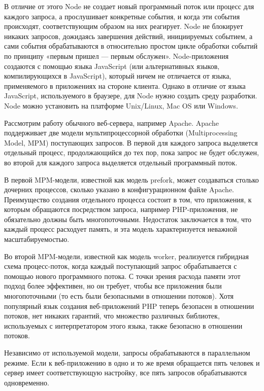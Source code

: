 В отличие от этого Node не создает новый программный поток или процесс для каждого запроса, а прослушивает конкретные события, и когда эти события происходят, соответствующим образом на них реагирует. Node не блокирует никаких запросов, дожидаясь завершения действий, инициируемых событием, а сами события обрабатываются в относительно простом цикле обработки событий по принципу «первым пришел — первым обслужен».
Node-приложения создаются с помощью языка JavaScript (или альтернативных языков, компилирующихся в JavaScript), который ничем не отличается от языка, применяемого в приложениях на стороне клиента. Однако в отличие от языка JavaScript, используемого в браузере, для Node нужно создать среду разработки. Node можно установить на платформе Unix/Linux, Mac OS или Windows.

Рассмотрим работу обычного веб-сервера, например Apache. Apache поддерживает две модели мультипроцессорной обработки (Multiprocessing Model, MPM) поступающих запросов. В первой для каждого запроса выделяется отдельный процесс, продолжающийся до тех пор, пока запрос не будет обслужен, во второй для каждого запроса выделяется отдельный программный поток.

В первой MPM-модели, известной как модель prefork, может создаваться столько дочерних процессов, сколько указано в конфигурационном файле Apache. Преимущество создания отдельного процесса состоит в том, что приложения, к которым обращаются посредством запроса, например PHP-приложения, не обязательно должны быть многопоточными. Недостаток заключается в том, что каждый процесс расходует память, и эта модель характеризуется неважной масштабируемостью.

Во второй MPM-модели, известной как модель worker, реализуется гибридная схема процесс-поток, когда каждый поступающий запрос обрабатывается с помощью нового программного потока. С точки зрения расхода памяти этот подход более эффективен, но он требует, чтобы все приложения были многопоточными (то есть были безопасными в отношении потоков). Хотя популярный язык создания веб-приложений PHP теперь безопасен в отношении потоков, нет никаких гарантий, что множество различных библиотек, используемых с интерпретатором этого языка, также безопасно в отношении потоков.

Независимо от используемой модели, запросы обрабатываются в параллельном режиме. Если к веб-приложению в одно и то же время обращается пять человек и сервер имеет соответствующую настройку, все пять запросов обрабатываются одновременно.

